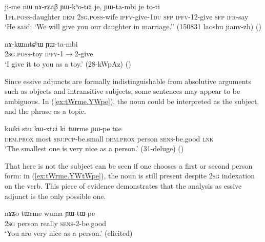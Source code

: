 \begin{exe}
\ex \label{ex:nArZaB.YWkhotCi}
\gll  ji-me nɯ nɤ-rʑaβ ɲɯ-kʰo-tɕi je, ɲɯ-ta-mbi je to-ti\\
 \textsc{1pl}.\textsc{poss}-daughter \textsc{dem} \textsc{2sg}.\textsc{poss}-wife \textsc{ipfv}-give-\textsc{1du} \textsc{sfp} \textsc{ipfv}-1\fl{}2-give \textsc{sfp} \textsc{ifr}-say \\
 \glt `He said: `We will give you our daughter in marriage.'' (150831 laoshu jianv-zh)
()
\end{exe} 

\begin{exe}
\ex \label{ex:nAkWmtChW.YWtambi}
\gll  nɤ-kɯmtɕʰɯ ɲɯ-ta-mbi \\
 \textsc{2sg}.\textsc{poss}-toy \textsc{ipfv}-1$\rightarrow$2-give   \\
 \glt `I give it to you as a toy.' (28-kWpAz) ()
\end{exe}

Since essive adjuncts are formally indistinguishable from absolutive arguments such as objects and intransitive subjects, some sentences may appear to be ambiguous. In (\ref{ex:tWrme.YWpe}), the noun  could be interpreted as the subject, and the phrase  as a topic.

\begin{exe}
\ex \label{ex:tWrme.YWpe}
\gll kɯki stu kɯ-xtɕi ki tɯrme ɲɯ-pe tɕe \\
\textsc{dem}.\textsc{prox} most \textsc{sbj}:\textsc{pcp}-be.small \textsc{dem}.\textsc{prox} person \textsc{sens}-be.good \textsc{lnk} \\
\glt `The smallest one is very nice as a person.' (31-deluge)
()
\end{exe}

That  here is not the subject can be seen if one chooses a first or second person form: in (\ref{ex:tWrme.YWtWpe}), the noun  is still present despite \textsc{2sg} indexation on the verb. This piece of evidence demonstrates that the analysis as essive adjunct is the only possible one.

\begin{exe}
\ex \label{ex:tWrme.YWtWpe}
\gll  nɤʑo tɯrme wuma ɲɯ-tɯ-pe \\
\textsc{2sg} person really \textsc{sens}-2-be.good \\
\glt `You are very nice as a person.'  (elicited)
\end{exe}

